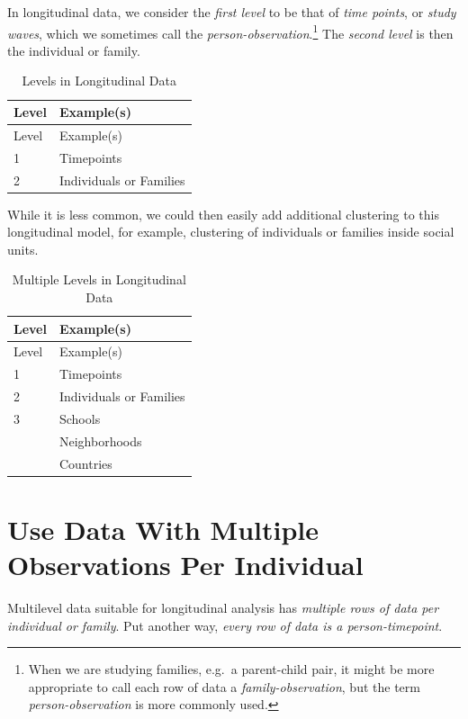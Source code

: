 \documentclass[
  letterpaper,
  DIV=11,
  numbers=noendperiod]{scrreprt}
\begin{document}
In longitudinal data, we consider the \emph{first level} to be that of
\emph{time points}, or \emph{study waves}, which we sometimes call the
\emph{person-observation}.\footnote{When we are studying families,
  e.g.~a parent-child pair, it might be more appropriate to call each
  row of data a \emph{family-observation}, but the term
  \emph{person-observation} is more commonly used.} The \emph{second
level} is then the individual or family.

\hypertarget{tbl-levelslongitudinal}{}
\begin{longtable}[]{@{}ll@{}}
\caption{\label{tbl-levelslongitudinal}Levels in Longitudinal
Data}\tabularnewline
\toprule()
Level & Example(s) \\
\midrule()
\endfirsthead
\toprule()
Level & Example(s) \\
\midrule()
\endhead
1 & Timepoints \\
2 & Individuals or Families \\
\bottomrule()
\end{longtable}

While it is less common, we could then easily add additional clustering
to this longitudinal model, for example, clustering of individuals or
families inside social units.

\hypertarget{tbl-levelslongitudinal2}{}
\begin{longtable}[]{@{}ll@{}}
\caption{\label{tbl-levelslongitudinal2}Multiple Levels in Longitudinal
Data}\tabularnewline
\toprule()
Level & Example(s) \\
\midrule()
\endfirsthead
\toprule()
Level & Example(s) \\
\midrule()
\endhead
1 & Timepoints \\
2 & Individuals or Families \\
3 & Schools \\
& Neighborhoods \\
& Countries \\
\bottomrule()
\end{longtable}

\hypertarget{use-data-with-multiple-observations-per-individual}{%
\section{Use Data With Multiple Observations Per
Individual}\label{use-data-with-multiple-observations-per-individual}}

Multilevel data suitable for longitudinal analysis has \emph{multiple
rows of data per individual or family}. Put another way, \emph{every row
of data is a person-timepoint}.
\end{document}
